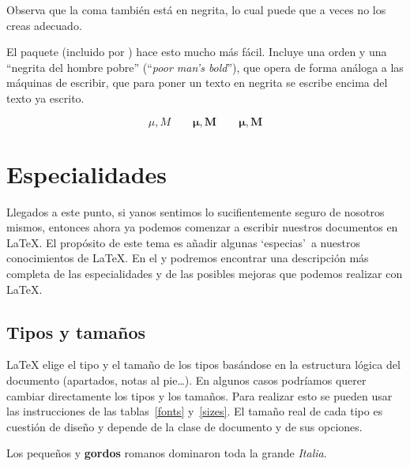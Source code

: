 \noindent Observa que  la coma también está en negrita,  lo cual puede
que a veces no los creas adecuado.

El paquete   (incluido por )  hace esto mucho
más  fácil. Incluye  una  orden   y  una ``negrita  del
hombre  pobre''   (``\emph{poor man's  bold}''), que  opera de
forma análoga a  las máquinas de escribir, que para  poner un texto en
negrita se escribe encima del texto ya escrito.

\ifx\boldsymbol\undefined\else
\begin{example}
\begin{displaymath}
\mu, M \qquad
\boldsymbol{\mu}, \boldsymbol{M}
\qquad \pmb{\mu}, \pmb{M}
\end{displaymath}
\end{example}
\fi



\section{Especialidades}
\begin{intro}
Llegados a este punto, si  yanos sentimos lo sucifientemente seguro de
nosotros  mismos,  entonces  ahora  ya  podemos  comenzar  a  escribir
nuestros documentos  en \LaTeX.  El propósito de  este tema  es añadir
algunas  `especias'\  a  nuestros   conocimientos  de  \LaTeX.  En  el
{\normalfont\manual{}} y  {\normalfont \companion}  podremos encontrar
una descripción más  completa de las especialidades y  de las posibles
mejoras que podemos realizar con \LaTeX.
\end{intro}

\subsection{Tipos y tamaños}

  \LaTeX{} elige  el
tipo y  el tamaño de los  tipos basándose en la  estructura lógica del
documento (apartados, notas al  pie\ldots). En algunos casos podríamos
querer cambiar  directamente los  tipos y  los tamaños.  Para realizar
esto  se  pueden  usar  las instrucciones  de  las  tablas~\ref{fonts}
y~\ref{sizes}. El  tamaño real de  cada tipo  es cuestión de  diseño y
depende de la clase de documento y de sus opciones.

\begin{example}
{\small Los pequeños y
\textbf{gordos} romanos dominaron}
{\Large toda la grande
\textit{Italia}.}
\end{example}

